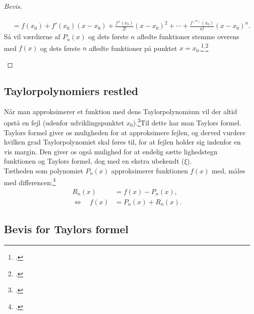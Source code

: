 \documentclass[12pt, a4paper]{article}
\begin{document}
\begin{refsection}
\begin{proof}[Bevis]
\begin{savenotes}
\begin{mdframed}
\begin{equation}
\begin{aligned}
              &=f(x_0)+f'(x_0)(x-x_0)+\frac{f''(x_0)}{2!}(x-x_0)^2+\cdots+\frac{f^{(n)}(x_0)}{n!}(x-x_0)^n.
    \end{aligned}
\end{equation}
\renewcommand{\thempfootnote}{\arabic{footnote}} 
Så vil værdierne af $P_n(x)$ og dets første $n$ afledte funktioner stemme overens med $f(x)$ og dets første $n$ afledte funktioner på punktet $x=x_0$.\footcite[s. 647-648]{calculuswithanalyticgeometry}$^,$\footcite[s.1-2]{alsholm2}%
\end{mdframed}
   \end{savenotes} 
\end{proof}
\subsection{Taylorpolynomiers restled}
Når man approksimerer et funktion med dens Taylorpolynomium vil der altid opstå en fejl (udenfor udviklingspunktet $x_0$).\footcite[s. 4]{alsholm1}Til dette har man Taylors formel.\\
Taylors formel giver os muligheden for at approksimere fejlen, og derved vurdere hvilken grad Taylorpolynomiet skal føres til, for at fejlen holder sig indenfor en vis margin. Den giver os også mulighed for at endelig sætte lighedstegn funktionen og Taylors formel, dog med en ekstra ubekendt ($\xi$).\\
Tætheden som polynomiet $P_n(x)$ approksimerer funktionen $f(x)$ med, måles med differencen:\footcite[s. 650]{calculuswithanalyticgeometry}
\begin{equation}\label{restled}
    \begin{aligned}
        R_n(x)&=f(x)-P_n(x),\\
        \Leftrightarrow \quad f(x)&=P_n(x)+R_n(x).
    \end{aligned}
\end{equation}
\subsection{Bevis for Taylors formel}


\end{refsection}
\end{document}

